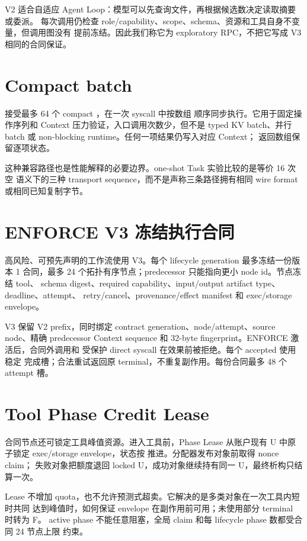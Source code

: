 V2 适合自适应 Agent Loop：模型可以先查询文件，再根据候选数决定读取摘要或委派。
每次调用仍检查 role/capability、scope、schema、资源和工具自身不变量，但调用图没有
提前冻结。因此我们称它为 exploratory RPC，不把它写成 V3 相同的合同保证。

\section{Compact batch}

 接受最多 64 个 compact ，在一次 syscall 中按数组
顺序同步执行。它用于固定操作序列和 Context 压力验证，入口调用次数少，但不是 typed
KV batch、并行 batch 或 non-blocking runtime。任何一项结果仍写入对应 Context；
返回数组保留逐项状态。

这种兼容路径也是性能解释的必要边界。one-shot Task 实验比较的是等价 16 次空
 语义下的三种 transport sequence，而不是声称三条路径拥有相同 wire
format 或相同已知复制字节。

\section{ENFORCE V3 冻结执行合同}

高风险、可预先声明的工作流使用 V3。每个 lifecycle generation 最多冻结一份版本 1
合同，最多 24 个拓扑有序节点；predecessor 只能指向更小 node id。节点冻结 tool、
schema digest、required capability、input/output artifact type、deadline、attempt、
retry/cancel、provenance/effect manifest 和 exec/storage envelope。

V3 保留 V2 prefix，同时绑定 contract generation、node/attempt、source node、精确
predecessor Context sequence 和 32-byte fingerprint。ENFORCE 激活后，合同外调用和
受保护 direct syscall 在效果前被拒绝。每个 accepted  使用稳定
完成槽；合法重试返回原 terminal，不重复副作用。每份合同最多 48 个 attempt 槽。

\section{Tool Phase Credit Lease}

合同节点还可锁定工具峰值资源。进入工具前，Phase Lease 从账户现有 U 中原子锁定
exec/storage envelope，状态按
 推进。分配器发布对象前取得 nonce claim；
失败对象把额度退回 locked U，成功对象继续持有同一 U，最终析构只结算一次。

Lease 不增加 quota，也不允许预测式超卖。它解决的是多类对象在一次工具内短时共同
达到峰值时，如何保证 envelope 在副作用前可用；未使用部分 terminal 时转为 F。
active phase 不能任意阻塞，全局 claim 和每 lifecycle phase 数都受合同 24 节点上限
约束。

